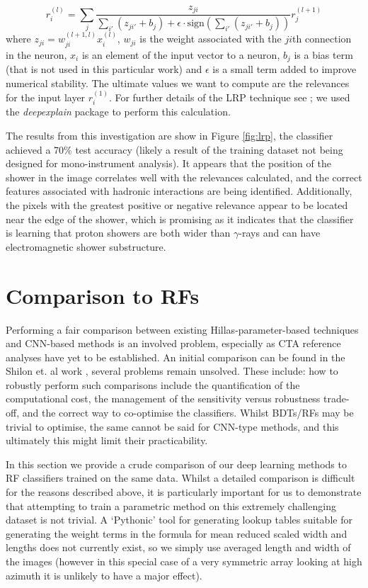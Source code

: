 \begin{equation}
r^{(l)}_i=\sum_j\frac{z_{ji}}{\sum_{i'}(z_{ji'}+b_j)+\epsilon\cdot\mathrm{sign} (\sum_{i'}(z_{ji'}+b_j))}r_j^{(l+1)}
\end{equation}
where $z_{ji}=w_{ji}^{(l+1,l)}x_i^{(l)}$, $w_{ji}$ is the weight associated with the $ji$th connection in the neuron, $x_i$ is an element of the input vector to a neuron, $b_j$ is a bias term (that is not used in this particular work) and $\epsilon$ is a small term added to improve numerical stability. The ultimate values we want to compute are the relevances for the input layer $r_i^{(1)}$. For further details of the LRP technique see \cite{LRP}; we used the \textit{deepexplain} package to perform this calculation.

The results from this investigation are show in Figure \ref{fig:lrp}, the classifier achieved a 70$\%$ test accuracy (likely a result of the training dataset not being designed for mono-instrument analysis). It appears that the position of the shower in the image correlates well with the relevances calculated, and the correct features associated with hadronic interactions are being identified. Additionally, the pixels with the greatest positive or negative relevance appear to be located near the edge of the shower, which is promising as it indicates that the classifier is learning that proton showers are both wider than $\gamma$-rays and can have electromagnetic shower substructure. 

\section{Comparison to RFs} \label{RFs}

Performing a fair comparison between existing Hillas-parameter-based techniques and CNN-based methods is an involved problem, especially as CTA reference analyses have yet to be established. An initial comparison can be found in the Shilon et. al work \cite{Shilon}, several problems remain unsolved. These include: how to robustly perform such comparisons include the quantification of the computational cost, the management of the sensitivity versus robustness trade-off, and the correct way to co-optimise the classifiers. Whilst BDTs/RFs may be trivial to optimise, the same cannot be said for CNN-type methods, and this ultimately this might limit their practicability.

In this section we provide a crude comparison of our deep learning methods to RF classifiers trained on the same data. Whilst a detailed comparison is difficult for the reasons described above, it is particularly important for us to demonstrate that attempting to train a parametric method on this extremely challenging dataset is not trivial. A `Pythonic' tool for generating lookup tables suitable for generating the weight terms in the formula for mean reduced scaled width and lengths does not currently exist, so we simply use averaged length and width of the images (however in this special case of a very symmetric array looking at high azimuth it is unlikely to have a major effect).

